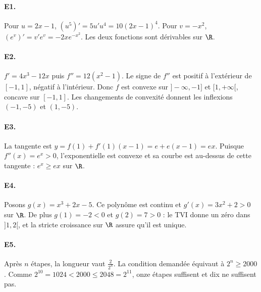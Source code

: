 \paragraph{E1.}Pour $u=2x-1$, $(u^5)'=5u' u^4=10(2x-1)^4$. Pour $v=-x^2$, $(e^v)'=v' e^v=-2xe^{-x^2}$. Les deux fonctions sont dérivables sur $\R$.

\paragraph{E2.}$f'=4x^3-12x$ puis $f''=12(x^2-1)$. Le signe de $f''$ est positif à l'extérieur de $[-1,1]$, négatif à l'intérieur. Donc $f$ est convexe sur $]-\infty,-1]$ et $[1,+\infty[$, concave sur $[-1,1]$. Les changements de convexité donnent les inflexions $(-1,-5)$ et $(1,-5)$.

\paragraph{E3.}La tangente est $y=f(1)+f'(1)(x-1)=e+e(x-1)=ex$. Puisque $f''(x)=e^x>0$, l'exponentielle est convexe et sa courbe est au-dessus de cette tangente : $e^x\ge ex$ sur $\R$.

\paragraph{E4.}Posons $g(x)=x^3+2x-5$. Ce polynôme est continu et $g'(x)=3x^2+2>0$ sur $\R$. De plus $g(1)=-2<0$ et $g(2)=7>0$ : le TVI donne un zéro dans $]1,2[$, et la stricte croissance sur $\R$ assure qu'il est unique.

\paragraph{E5.}Après $n$ étapes, la longueur vaut $\frac{2}{2^n}$. La condition demandée équivaut à $2^n\ge2000$. Comme $2^{10}=1024<2000\le2048=2^{11}$, onze étapes suffisent et dix ne suffisent pas.

